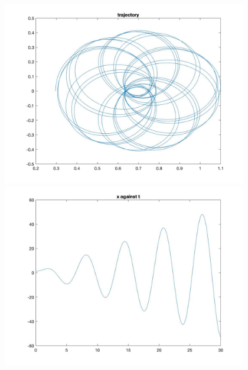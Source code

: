 \documentclass[11pt]{article}
\begin{document}
\begin{figure}[H]
\includegraphics[width = 12cm, height = 8cm]{Q4(9)}
\includegraphics[width = 12cm, height = 8cm]{Q4(10)}
\end{figure}
\end{document}

